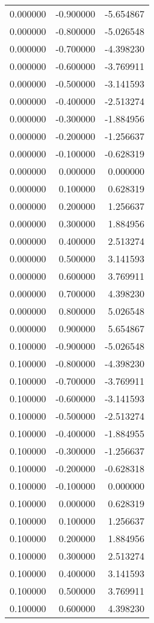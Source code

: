 \begin{tabular}{rrr}
0.000000 & -0.900000 & -5.654867 \\
0.000000 & -0.800000 & -5.026548 \\
0.000000 & -0.700000 & -4.398230 \\
0.000000 & -0.600000 & -3.769911 \\
0.000000 & -0.500000 & -3.141593 \\
0.000000 & -0.400000 & -2.513274 \\
0.000000 & -0.300000 & -1.884956 \\
0.000000 & -0.200000 & -1.256637 \\
0.000000 & -0.100000 & -0.628319 \\
0.000000 & 0.000000 & 0.000000 \\
0.000000 & 0.100000 & 0.628319 \\
0.000000 & 0.200000 & 1.256637 \\
0.000000 & 0.300000 & 1.884956 \\
0.000000 & 0.400000 & 2.513274 \\
0.000000 & 0.500000 & 3.141593 \\
0.000000 & 0.600000 & 3.769911 \\
0.000000 & 0.700000 & 4.398230 \\
0.000000 & 0.800000 & 5.026548 \\
0.000000 & 0.900000 & 5.654867 \\
0.100000 & -0.900000 & -5.026548 \\
0.100000 & -0.800000 & -4.398230 \\
0.100000 & -0.700000 & -3.769911 \\
0.100000 & -0.600000 & -3.141593 \\
0.100000 & -0.500000 & -2.513274 \\
0.100000 & -0.400000 & -1.884955 \\
0.100000 & -0.300000 & -1.256637 \\
0.100000 & -0.200000 & -0.628318 \\
0.100000 & -0.100000 & 0.000000 \\
0.100000 & 0.000000 & 0.628319 \\
0.100000 & 0.100000 & 1.256637 \\
0.100000 & 0.200000 & 1.884956 \\
0.100000 & 0.300000 & 2.513274 \\
0.100000 & 0.400000 & 3.141593 \\
0.100000 & 0.500000 & 3.769911 \\
0.100000 & 0.600000 & 4.398230 \\

\end{tabular}
